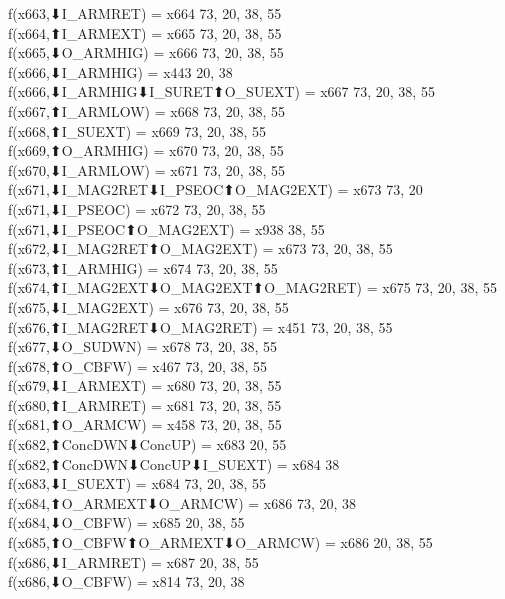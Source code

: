 f(x663,⬇I_ARMRET) = x664 {73, 20, 38, 55} \\
f(x664,⬆I_ARMEXT) = x665 {73, 20, 38, 55} \\
f(x665,⬇O_ARMHIG) = x666 {73, 20, 38, 55} \\
f(x666,⬇I_ARMHIG) = x443 {20, 38} \\
f(x666,⬇I_ARMHIG⬇I_SURET⬆O_SUEXT) = x667 {73, 20, 38, 55} \\
f(x667,⬆I_ARMLOW) = x668 {73, 20, 38, 55} \\
f(x668,⬆I_SUEXT) = x669 {73, 20, 38, 55} \\
f(x669,⬆O_ARMHIG) = x670 {73, 20, 38, 55} \\
f(x670,⬇I_ARMLOW) = x671 {73, 20, 38, 55} \\
f(x671,⬇I_MAG2RET⬇I_PSEOC⬆O_MAG2EXT) = x673 {73, 20} \\
f(x671,⬇I_PSEOC) = x672 {73, 20, 38, 55} \\
f(x671,⬇I_PSEOC⬆O_MAG2EXT) = x938 {38, 55} \\
f(x672,⬇I_MAG2RET⬆O_MAG2EXT) = x673 {73, 20, 38, 55} \\
f(x673,⬆I_ARMHIG) = x674 {73, 20, 38, 55} \\
f(x674,⬆I_MAG2EXT⬇O_MAG2EXT⬆O_MAG2RET) = x675 {73, 20, 38, 55} \\
f(x675,⬇I_MAG2EXT) = x676 {73, 20, 38, 55} \\
f(x676,⬆I_MAG2RET⬇O_MAG2RET) = x451 {73, 20, 38, 55} \\
f(x677,⬇O_SUDWN) = x678 {73, 20, 38, 55} \\
f(x678,⬆O_CBFW) = x467 {73, 20, 38, 55} \\
f(x679,⬇I_ARMEXT) = x680 {73, 20, 38, 55} \\
f(x680,⬆I_ARMRET) = x681 {73, 20, 38, 55} \\
f(x681,⬆O_ARMCW) = x458 {73, 20, 38, 55} \\
f(x682,⬆ConcDWN⬇ConcUP) = x683 {20, 55} \\
f(x682,⬆ConcDWN⬇ConcUP⬇I_SUEXT) = x684 {38} \\
f(x683,⬇I_SUEXT) = x684 {73, 20, 38, 55} \\
f(x684,⬆O_ARMEXT⬇O_ARMCW) = x686 {73, 20, 38} \\
f(x684,⬇O_CBFW) = x685 {20, 38, 55} \\
f(x685,⬆O_CBFW⬆O_ARMEXT⬇O_ARMCW) = x686 {20, 38, 55} \\
f(x686,⬇I_ARMRET) = x687 {20, 38, 55} \\
f(x686,⬇O_CBFW) = x814 {73, 20, 38} \\
